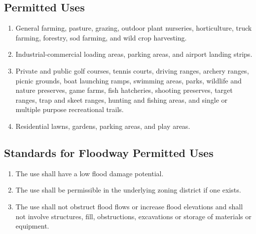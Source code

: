 \subsection{Permitted Uses}
\begin{enumerate}[{\indent}1)]
    \item General farming, pasture, grazing, outdoor plant nurseries, horticulture, truck farming, forestry, sod farming, and wild crop harvesting.
    \item Industrial-commercial loading areas, parking areas, and airport landing strips.
    \item Private and public golf courses, tennis courts, driving ranges, archery ranges, picnic grounds, boat launching ramps, swimming areas, parks, wildlife and nature preserves, game farms, fish hatcheries, shooting preserves, target ranges, trap and skeet ranges, hunting and fishing areas, and single or multiple purpose recreational trails.
    \item Residential lawns, gardens, parking areas, and play areas.
\end{enumerate}
\subsection{Standards for Floodway Permitted Uses}
\begin{enumerate}[{\indent}1)]
    \item The use shall have a low flood damage potential.
    \item The use shall be permissible in the underlying zoning district if one exists.
    \item The use shall not obstruct flood flows or increase flood elevations and shall not involve structures, fill, obstructions, excavations or storage of materials or equipment.
\end{enumerate}
